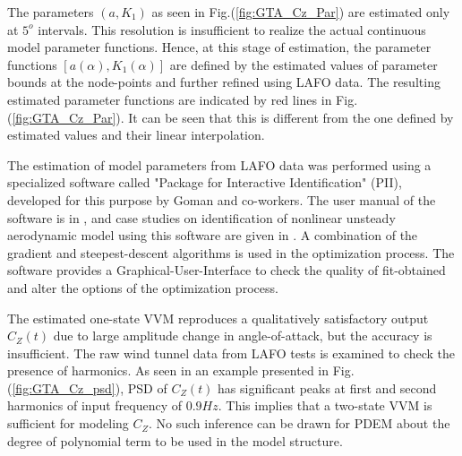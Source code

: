 \documentclass{AIAA}
\begin{document}

The parameters $(a,K_1)$ as seen in Fig.(\ref{fig:GTA_Cz_Par}) are estimated only at $5^o$ intervals. This resolution is insufficient to realize the actual continuous model parameter functions. Hence, at this stage of estimation, the parameter functions $[a(\alpha),K_1(\alpha)]$ are defined by the estimated values of parameter bounds at the node-points and further refined using LAFO data. The resulting estimated parameter functions are indicated by red lines in Fig.(\ref{fig:GTA_Cz_Par}). It can be seen that this is different from the one defined by estimated values and their linear interpolation.

The estimation of model parameters from LAFO data was performed using a specialized software called "Package for Interactive Identification" (PII), developed for this purpose by Goman and co-workers. The user manual of the software is in \cite{PIImanual1,PIImanual2}, and case studies on identification of nonlinear unsteady aerodynamic model using this software are given in \cite{GomanICAS94,GomanICAS97}. A combination of the gradient and steepest-descent algorithms is used in the optimization process. The software provides a Graphical-User-Interface to check the quality of fit-obtained and alter the options of the optimization process.

The estimated one-state VVM reproduces a qualitatively satisfactory output $C_Z(t)$ due to large amplitude change in angle-of-attack, but the accuracy is insufficient. The raw wind tunnel data from LAFO tests is examined to check the presence of harmonics. As seen in an example presented in Fig.(\ref{fig:GTA_Cz_psd}), PSD of $C_Z(t)$ has significant peaks at first and second harmonics of input frequency of $0.9 Hz$. This implies that a two-state VVM is sufficient for modeling $C_Z$. No such inference can be drawn for PDEM about the degree of polynomial term to be used in the model structure.
\end{document}
